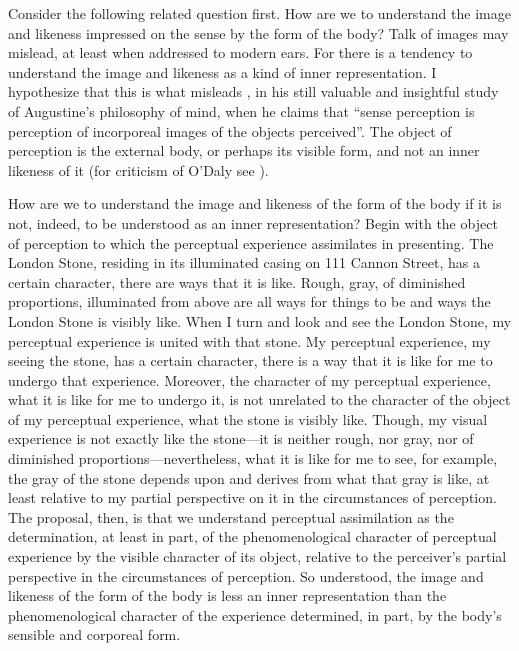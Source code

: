 \documentclass[12pt]{article}
\begin{document}
Consider the following related question first. How are we to understand the image and likeness impressed on the sense by the form of the body? Talk of images may mislead, at least when addressed to modern ears. For there is a tendency to understand the image and likeness as a kind of inner representation. I hypothesize that this is what misleads \citet[106]{ODaly:1987fq}, in his still valuable and insightful study of Augustine's philosophy of mind, when he claims that ``sense perception is perception of incorporeal images of the objects perceived''. The object of perception is the external body, or perhaps its visible form, and not an inner likeness of it (for criticism of O'Daly see \citealt{Matthews:2014aa,Silva:2014bh}).

How are we to understand the image and likeness of the form of the body if it is not, indeed, to be understood as an inner representation? Begin with the object of perception to which the perceptual experience assimilates in presenting. The London Stone, residing in its illuminated casing on 111 Cannon Street, has a certain character, there are ways that it is like. Rough, gray, of diminished proportions, illuminated from above are all ways for things to be and ways the London Stone is visibly like. When I turn and look and see the London Stone, my perceptual experience is united with that stone. My perceptual experience, my seeing the stone, has a certain character, there is a way that it is like for me to undergo that experience. Moreover, the character of my perceptual experience, what it is like for me to undergo it, is not unrelated to the character of the object of my perceptual experience, what the stone is visibly like. Though, my visual experience is not exactly like the stone---it is neither rough, nor gray, nor of diminished proportions---nevertheless, what it is like for me to see, for example, the gray of the stone depends upon and derives from what that gray is like, at least relative to my partial perspective on it in the circumstances of perception. The proposal, then, is that we understand perceptual assimilation as the determination, at least in part, of the phenomenological character of perceptual experience by the visible character of its object, relative to the perceiver's partial perspective in the circumstances of perception. So understood, the image and likeness of the form of the body is less an inner representation than the phenomenological character of the experience determined, in part, by the body's sensible and corporeal form.
\end{document}
